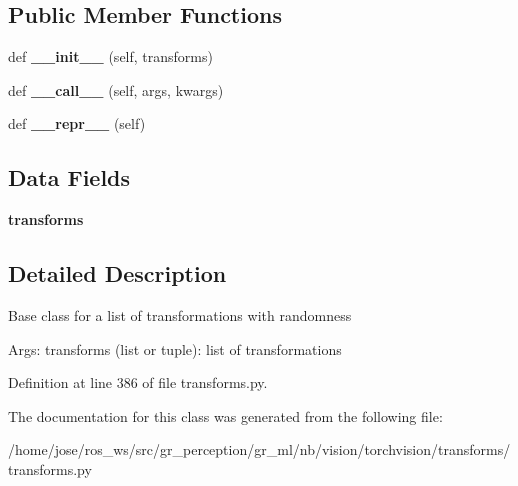 \subsection*{Public Member Functions}
\begin{DoxyCompactItemize}
\item 
\mbox{\label{classtorchvision_1_1transforms_1_1transforms_1_1RandomTransforms_af00a427d7fe794e8144c04789d2fdedf}} 
def {\bfseries \+\_\+\+\_\+init\+\_\+\+\_\+} (self, transforms)
\item 
\mbox{\label{classtorchvision_1_1transforms_1_1transforms_1_1RandomTransforms_af37887664125c73f0b00e0bfa3a64e79}} 
def {\bfseries \+\_\+\+\_\+call\+\_\+\+\_\+} (self, args, kwargs)
\item 
\mbox{\label{classtorchvision_1_1transforms_1_1transforms_1_1RandomTransforms_a6fb5b596f5458707c7f44a683a8adfed}} 
def {\bfseries \+\_\+\+\_\+repr\+\_\+\+\_\+} (self)
\end{DoxyCompactItemize}
\subsection*{Data Fields}
\begin{DoxyCompactItemize}
\item 
\mbox{\label{classtorchvision_1_1transforms_1_1transforms_1_1RandomTransforms_a9d3449088a38cea89a71c83e0849d013}} 
{\bfseries transforms}
\end{DoxyCompactItemize}


\subsection{Detailed Description}
\begin{DoxyVerb}Base class for a list of transformations with randomness

Args:
    transforms (list or tuple): list of transformations
\end{DoxyVerb}
 

Definition at line 386 of file transforms.\+py.



The documentation for this class was generated from the following file\+:\begin{DoxyCompactItemize}
\item 
/home/jose/ros\+\_\+ws/src/gr\+\_\+perception/gr\+\_\+ml/nb/vision/torchvision/transforms/transforms.\+py\end{DoxyCompactItemize}
